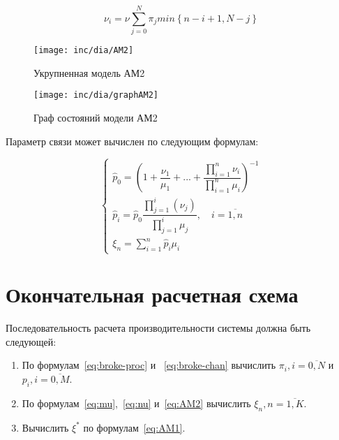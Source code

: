 \documentclass[utf8x, 12pt]{G7-32} %
\begin{document}
\begin{equation}
\label{eq:nu}
\nu_i = \nu \sum \limits_{j=0}^N \pi_j min \left\lbrace n-i+1, N-j \right\rbrace
\end{equation}



\begin{figure}[ht]
\centering
\texttt{[image: inc/dia/AM2]}
\caption{Укрупненная модель АМ2}
\label{fig:AM2}
\end{figure}

\begin{figure}[ht]
\centering
\texttt{[image: inc/dia/graphAM2]}
\caption{Граф состояний модели АМ2}
\label{fig:graphAM2}
\end{figure}


Параметр связи может вычислен по следующим формулам:


\begin{equation}
\label{eq:AM2}
\left\{
   \begin{array}{lcl}
	\hat{p}_{0} = \left( 1 + \dfrac{\nu_1}{\mu_1} +  ... + \dfrac{\prod \limits_{i=1}^n \nu_i}{\prod \limits_{i=1}^n \mu_i} \right) ^{-1} \\
	\hat{p}_{i} = \hat{p}_{0} \dfrac{\prod \limits_{j=1}^{i} (\nu_j)}{\prod \limits_{j=1}^i \mu_{j}}, \quad i = \overline{1,n}  \\ 
	\xi_n = \sum \limits_{i=1}^n \hat{p}_i \mu_i
   \end{array}
\right.
\end{equation}


\section{Окончательная расчетная схема}
Последовательность расчета производительности системы должна быть следующей:

\begin{enumerate}
\item По формулам~\ref{eq:broke-proc} и ~\ref{eq:broke-chan} вычислить $\pi_i, i=\overline{0,N}$ и $p_i, i=\overline{0,M} $.
\item По формулам~\ref{eq:mu},~\ref{eq:nu} и~\ref{eq:AM2} вычислить $\xi_n, n=\overline{1,K}$.
\item Вычислить $\xi^{*}$ по формулам~\ref{eq:AM1}.
\end{enumerate}

\mainmatter %


\backmatter %



\appendix   %
\end{document}
